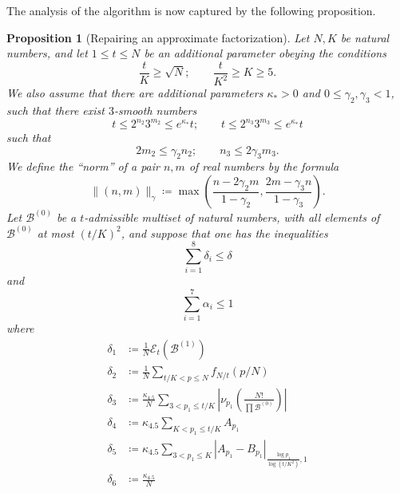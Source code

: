 \documentclass[10pt,a4paper,reqno]{amsart}
\numberwithin{equation}{section}
\theoremstyle{plain}
\newtheorem{proposition}[proposition]{Proposition}
\theoremstyle{definition}
\newcommand\tuple{{\mathcal B}}
\newcommand\excess{{\mathcal{E}}}
\begin{document}
The analysis of the algorithm is now captured by the following proposition.

\begin{proposition}[Repairing an approximate factorization]\label{repair}  Let $N, K$ be natural numbers, and let $1 \leq t \leq N$ be an additional parameter obeying the conditions
\begin{equation}\label{conditions}
    \frac{t}{K} \geq \sqrt{N}; \qquad \frac{t}{K^2} \geq K \geq 5.
\end{equation}
We also assume that there are additional parameters $\kappa_* > 0$ and $0 \leq \gamma_2, \gamma_3 < 1$, such that there exist $3$-smooth numbers
\begin{equation}\label{tlip}
  t \leq 2^{n_2} 3^{m_2} \leq e^{\kappa_*} t; \qquad t \leq 2^{n_3} 3^{m_3} \leq e^{\kappa_*} t
\end{equation}
such that
\begin{equation}\label{nm}
  2m_2 \leq \gamma_2 n_2; \qquad n_3 \leq 2\gamma_3 m_3.
\end{equation}
We define the ``norm'' of a pair $n,m$ of real numbers by the formula
$$ \| (n,m) \|_\gamma \coloneqq \max\left( \frac{n-2\gamma_2 m}{1-\gamma_2}, \frac{2m-\gamma_3 n}{1-\gamma_3} \right).$$
Let $\tuple^{(0)}$ be a $t$-admissible multiset of natural numbers, with all elements of $\tuple^{(0)}$ at most $(t/K)^2$, and suppose that one has the inequalities
\begin{equation}\label{delta-cond}
\sum_{i=1}^8 \delta_i \leq \delta
\end{equation}
and
\begin{equation}\label{alpha-cond}
  \sum_{i=1}^7 \alpha_i \leq 1
\end{equation}
where
\begin{align}
\delta_1 &\coloneqq \frac{1}{N} \excess_t(\tuple^{(1)}) \label{delta1-def}  \\
\delta_2 &\coloneqq \frac{1}{N} \sum_{t/K < p \leq N} f_{N/t}(p/N) \label{delta2-def}  \\
\delta_3 &\coloneqq \frac{\kappa_{4.5}}{N}  \sum_{3 < p_1 \leq t/K} \left|\nu_{p_1}\left( \frac{N!}{\prod \tuple^{(0)}} \right)\right| \label{delta3-def}  \\
\delta_4 &\coloneqq \kappa_{4.5} \sum_{K < p_1 \leq t/K} A_{p_1} \label{delta4-def}  \\
\delta_5 &\coloneqq \kappa_{4.5} \sum_{3 < p_1 \leq K} |A_{p_1} - B_{p_1}|_{\frac{\log p_1}{\log(t/K^2)},1} \label{delta5-def}  \\
\delta_6 &\coloneqq \frac{\kappa_{4.5}}{N} \label{delta6-def}  \\

\end{align}
\end{proposition}
\end{document}
